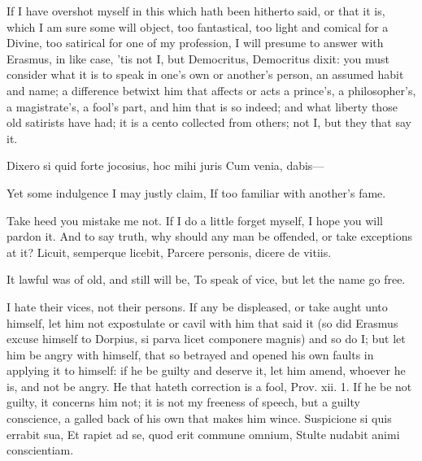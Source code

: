 {If I have overshot myself in this which hath been hitherto said, or
that it is, which I am sure some will object, too fantastical, too
light and comical for a Divine, too satirical for one of my profession,
I will presume to answer with Erasmus, in like case, 'tis not I,
but Democritus, Democritus dixit: you must consider what it is to speak
in one's own or another's person, an assumed habit and name; a
difference betwixt him that affects or acts a prince's, a
philosopher's, a magistrate's, a fool's part, and him that is so
indeed; and what liberty those old satirists have had; it is a cento
collected from others; not I, but they that say it.

Dixero si quid forte jocosius, hoc mihi juris
Cum venia, dabis---

Yet some indulgence I may justly claim,
If too familiar with another's fame.

Take heed you mistake me not. If I do a little forget myself, I hope
you will pardon it. And to say truth, why should any man be offended,
or take exceptions at it?
Licuit, semperque licebit,
Parcere personis, dicere de vitiis.

It lawful was of old, and still will be,
To speak of vice, but let the name go free.

I hate their vices, not their persons. If any be displeased, or take
aught unto himself, let him not expostulate or cavil with him that said
it (so did Erasmus excuse himself to Dorpius, si parva licet
componere magnis) and so do I; but let him be angry with himself, that
so betrayed and opened his own faults in applying it to himself:
if he be guilty and deserve it, let him amend, whoever he is, and
not be angry. He that hateth correction is a fool, Prov. xii. 1. If he
be not guilty, it concerns him not; it is not my freeness of speech,
but a guilty conscience, a galled back of his own that makes him wince.
Suspicione si quis errabit sua,
Et rapiet ad se, quod erit commune omnium,
Stulte nudabit animi conscientiam.

}
